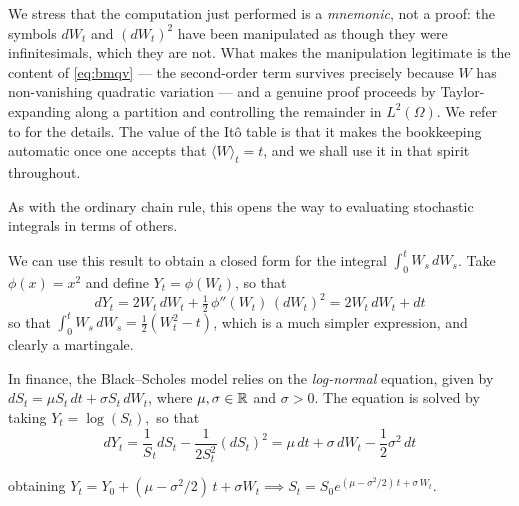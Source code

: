 We stress that the computation just performed is a \emph{mnemonic}, not a proof: the symbols $dW_t$ and $(dW_t)^2$ have been manipulated as though they were infinitesimals, which they are not. What makes the manipulation legitimate is the content of \eqref{eq:bmqv} --- the second-order term survives precisely because $W$ has non-vanishing quadratic variation --- and a genuine proof proceeds by Taylor-expanding along a partition and controlling the remainder in $L^2(\Omega)$. We refer to \cite{kuo2006} for the details. The value of the Itô table is that it makes the bookkeeping automatic once one accepts that $\langle W \rangle_t = t$, and we shall use it in that spirit throughout.

As with the ordinary chain rule, this opens the way to evaluating stochastic integrals in terms of others.

\begin{example}
 We can use this result to obtain a closed form for the integral $\int_0^t W_s\,dW_s$. Take $\phi(x) = x^2$ and define $Y_t = \phi(W_t)$, so that
 \begin{equation}
     dY_t = 2W_t\,dW_t + \tfrac{1}{2}\,\phi''(W_t)\,(dW_t)^2 = 2 W_t\,dW_t + dt
 \end{equation}
 so that $\int_0^t W_s\,dW_s = \frac 1 2 \left( W_t^2 - t\right)$, which is a much simpler expression, and clearly a martingale.
\end{example}

\begin{example}\label{example:blackscholessde}
    In finance, the Black--Scholes model relies on the \textit{log-normal} equation, given by $dS_t = \mu S_t \, dt + \sigma S_t \, dW_t$, where $\mu, \sigma \in \mathbb{R}$ and $\sigma > 0$. The equation is solved by taking $Y_t = \log (S_t),$ so that
    \begin{equation}
        dY_t = \frac 1 S_t dS_t -\frac{1}{2S_t^2}(dS_t)^2 = \mu\,dt + \sigma\, dW_t -  \frac 1 2 \sigma^2 \, dt
    \end{equation}

    obtaining $Y_t = Y_0 + (\mu-\sigma^2 / 2) \, t + \sigma W_t \implies S_t = S_0e^{(\mu-\sigma^2/ 2)\, t + \sigma \, W_t} $.
\end{example}

